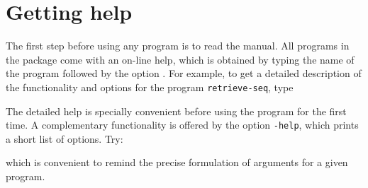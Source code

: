 \chapter{Getting help} 

The first step before using any program is to read the manual. All
programs in the \RSAT package come with an on-line help, which is
obtained by typing the name of the program followed by the option
. For example, to get a detailed description of the
functionality and options for the program \texttt{retrieve-seq}, type


The detailed help is specially convenient before using the program for
the first time. A complementary functionality is offered by the option
\texttt{-help}, which prints a short list of options. Try:


which is convenient to remind the precise formulation of arguments for
a given program.



